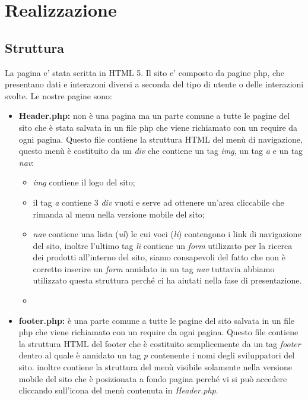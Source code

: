 \section{Realizzazione}
\subsection{Struttura}
La pagina e' stata scritta in HTML 5.\newline
Il sito e' composto da pagine php, che presentano dati e interazoni diversi a seconda del tipo di utente o delle interazioni svolte.
Le nostre pagine sono:
\begin{itemize}
	
 \item \textbf{Header.php:} non è una pagina ma un parte comune a tutte le pagine del sito che è stata salvata in un file php che viene richiamato con un require da ogni pagina. Questo file contiene la struttura HTML del menù di navigazione, questo menù è costituito da un \emph{div} che contiene un tag \emph{img}, un tag \emph{a} e un tag \emph{nav}:
 \begin{itemize}
 	\item \emph{img} contiene il logo del sito;
 	\item il tag \emph{a} contiene 3 \emph{div} vuoti e serve ad ottenere un'area cliccabile che rimanda al menu nella versione mobile del sito; 
 	\item \emph{nav} contiene una lista (\emph{ul}) le cui voci (\emph{li}) contengono i link di navigazione del sito, inoltre l'ultimo tag \emph{li} contiene un \emph{form} utilizzato per la ricerca dei prodotti all'interno del sito, siamo consapevoli del fatto che non è corretto inserire un \emph{form} annidato in un tag \emph{nav} tuttavia abbiamo utilizzato questa struttura perché ci ha aiutati nella fase di presentazione.
 	\item 
 \end{itemize}


 \item \textbf{footer.php:} è una parte comune a tutte le pagine del sito salvata in un file php che viene richiamato con un require da ogni pagina.
 Questo file contiene la struttura HTML del footer che è costituito semplicemente da un tag \emph{footer} dentro al quale è annidato un tag \emph{p} contenente i nomi degli sviluppatori del sito. 
 inoltre contiene la struttura del menù visibile solamente nella versione mobile del sito che è posizionata a fondo pagina perché vi si può accedere cliccando sull'icona del menù contenuta in \emph{Header.php}.
	

\end{itemize}
